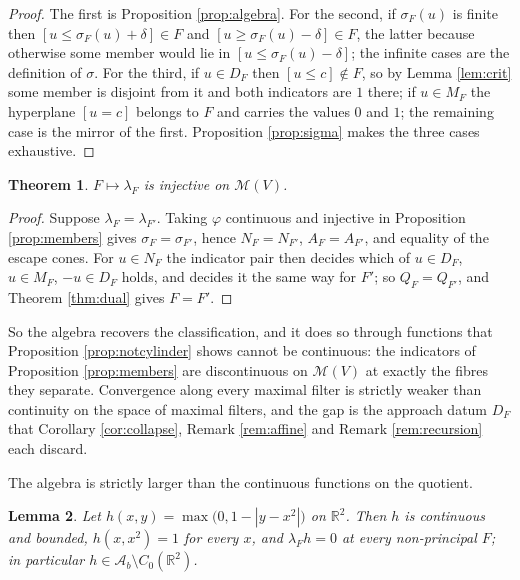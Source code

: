 \documentclass[11pt]{amsart}
\theoremstyle{plain}
\newtheorem{theorem}{Theorem}[section]
\newtheorem{lemma}[theorem]{Lemma}
\theoremstyle{definition}
\newcommand{\AAA}{\mathscr{A}}
\newcommand{\RR}{\mathbb{R}}
\begin{document}
\begin{proof}
The first is Proposition \ref{prop:algebra}. For the second, if $\sigma_F(u)$ is finite then $[u\le\sigma_F(u)+\delta]\in F$ and $[u\ge\sigma_F(u)-\delta]\in F$, the latter because otherwise some member would lie in $[u\le\sigma_F(u)-\delta]$; the infinite cases are the definition of $\sigma$. For the third, if $u\in D_F$ then $[u\le c]\notin F$, so by Lemma \ref{lem:crit} some member is disjoint from it and both indicators are $1$ there; if $u\in M_F$ the hyperplane $[u=c]$ belongs to $F$ and carries the values $0$ and $1$; the remaining case is the mirror of the first. Proposition \ref{prop:sigma} makes the three cases exhaustive.
\end{proof}

\begin{theorem}\label{thm:charsep}
$F\mapsto\lambda_F$ is injective on $\mathcal{M}(V)$.
\end{theorem}

\begin{proof}
Suppose $\lambda_F=\lambda_{F'}$. Taking $\varphi$ continuous and injective in Proposition \ref{prop:members} gives $\sigma_F=\sigma_{F'}$, hence $N_F=N_{F'}$, $A_F=A_{F'}$, and equality of the escape cones. For $u\in N_F$ the indicator pair then decides which of $u\in D_F$, $u\in M_F$, $-u\in D_F$ holds, and decides it the same way for $F'$; so $Q_F=Q_{F'}$, and Theorem \ref{thm:dual} gives $F=F'$.
\end{proof}

So the algebra recovers the classification, and it does so through functions that Proposition \ref{prop:notcylinder} shows cannot be continuous: the indicators of Proposition \ref{prop:members} are discontinuous on $\mathcal{M}(V)$ at exactly the fibres they separate. Convergence along every maximal filter is strictly weaker than continuity on the space of maximal filters, and the gap is the approach datum $D_F$ that Corollary \ref{cor:collapse}, Remark \ref{rem:affine} and Remark \ref{rem:recursion} each discard.

The algebra is strictly larger than the continuous functions on the quotient.

\begin{lemma}\label{lem:ridge}
Let $h(x,y)=\max\big(0,1-|y-x^{2}|\big)$ on $\RR^{2}$. Then $h$ is continuous and bounded, $h(x,x^{2})=1$ for every $x$, and $\lambda_Fh=0$ at every non-principal $F$; in particular $h\in\AAA_b\setminus C_0(\RR^2)$.
\end{lemma}
\end{document}
